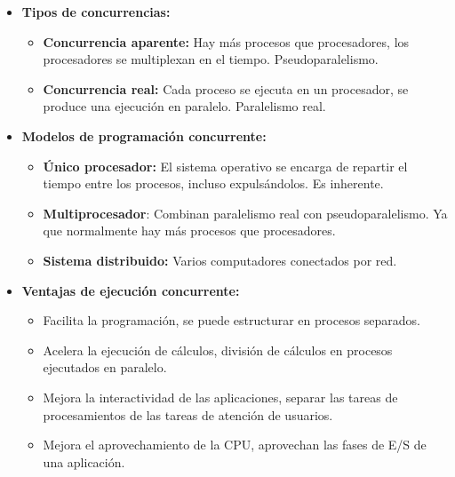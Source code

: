 \documentclass[12pt, twoside, openright]{report} %
\begin{document}
  \begin{itemize}
  \item \textbf{Tipos de concurrencias:}
    

    \begin{itemize}
    \item \textbf{Concurrencia aparente:} Hay más procesos que procesadores,
      los procesadores se multiplexan en el tiempo. Pseudoparalelismo.
      
    \item \textbf{Concurrencia real:} Cada proceso se ejecuta en un
      procesador, se produce una ejecución en paralelo. Paralelismo
      real.
      
    \end{itemize}
  \item \textbf{Modelos de programación concurrente:}
    

    \begin{itemize}
    \item \textbf{Único procesador:} El sistema operativo se encarga de
      repartir el tiempo entre los procesos, incluso expulsándolos. Es
      inherente.
      
    \item \textbf{Multiprocesador}: Combinan paralelismo real con
      pseudoparalelismo. Ya que normalmente hay más procesos que
      procesadores.
      
    \item \textbf{Sistema distribuido:} Varios computadores conectados por
      red.
      
    \end{itemize}
  \item \textbf{Ventajas de ejecución concurrente:}
    

    \begin{itemize}
    \item Facilita la programación, se puede estructurar en procesos
      separados.
      
    \item Acelera la ejecución de cálculos, división de cálculos en procesos
      ejecutados en paralelo.
      
    \item Mejora la interactividad de las aplicaciones, separar las tareas
      de procesamientos de las tareas de atención de usuarios.
      
    \item Mejora el aprovechamiento de la CPU, aprovechan las fases de E/S
      de una aplicación.
      

\end{itemize}
\end{itemize}
\end{document}
